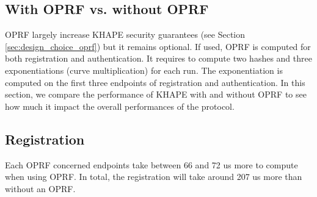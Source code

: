 ﻿\documentclass[../report.tex]{subfiles}
\begin{document}
\subsection{With OPRF vs. without OPRF} %
OPRF largely increase KHAPE security guarantees (see Section \ref{sec:design_choice_oprf}) but it remains optional.
If used, OPRF is computed for both registration and authentication.
It requires to compute two hashes and three exponentiations (curve multiplication) for each run. The exponentiation is computed on the first three endpoints of registration and authentication.
In this section, we compare the performance of KHAPE with and without OPRF to see how much it impact the overall performances of the protocol.

\subsection*{Registration}
Each OPRF concerned endpoints take between 66 and 72 us more to compute when using OPRF. In total, the registration will take around 207 us more than without an OPRF.
\end{document}
